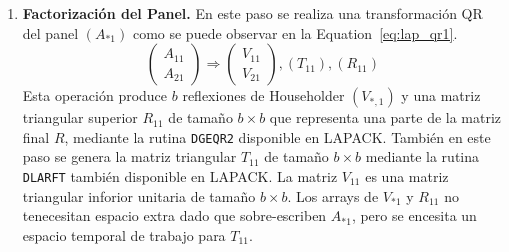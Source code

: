 \documentclass[12pt]{article}
\begin{document}
\begin{enumerate}
\item {\bf Factorización del Panel.} En este paso se realiza una transformación QR del panel $(A_{*1})$ como se puede observar en la Equation~\eqref{eq:lap_qr1}.
  \begin{equation}
    \label{eq:lap_qr1}
    \left(\begin{array}{c}
        A_{11} \\
        A_{21}
      \end{array}\right) \Longrightarrow
    \left(\begin{array}{c}
        V_{11} \\
        V_{21}
      \end{array}\right), (T_{11}), (R_{11})
  \end{equation}
  Esta operación produce $b$ reflexiones de Householder $(V_{*,1})$ y 
una matriz triangular superior $R_{11}$ de tamaño $b \times b$ que representa una parte de la matriz final $R$, mediante la rutina \texttt{DGEQR2} disponible en LAPACK. También en este paso se genera la matriz triangular $T_{11}$ de tamaño $b \times b$ mediante la rutina \texttt{DLARFT} también disponible en LAPACK. La matriz $V_{11}$ es una matriz triangular inforior unitaria de tamaño $b \times b$. Los arrays de $V_{*1}$ y $R_{11}$ no tenecesitan espacio extra dado que sobre-escriben $A_{*1}$, pero se encesita un espacio temporal de trabajo para $T_{11}$.


\end{enumerate}
\end{document}
